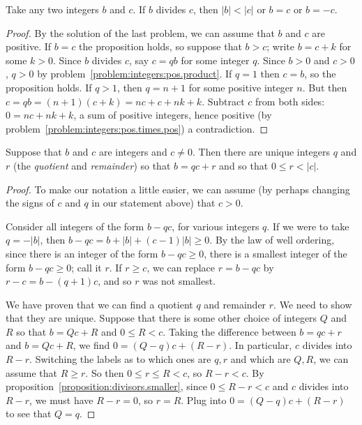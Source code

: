 \begin{proposition}\label{proposition:divisors.smaller}
Take any two integers \(b\) and \(c\).
If \(b\) divides \(c\), then \(|b| < |c|\) or \(b=c\) or \(b=-c\).
\end{proposition}
\begin{proof}
By the solution of the last problem, we can assume that \(b\) and \(c\) are positive.
If \(b=c\) the proposition holds, so suppose that \(b>c\); write \(b=c+k\) for some \(k>0\).
Since \(b\) divides \(c\), say \(c=qb\) for some integer \(q\).
Since \(b>0\) and \(c>0\), \(q>0\) by problem~\vref{problem:integers:pos.product}.
If \(q=1\) then \(c=b\), so the proposition holds.
If \(q>1\), then \(q=n+1\) for some positive integer \(n\).
But then \(c=qb=(n+1)(c+k)=nc+c+nk+k\).
Subtract \(c\) from both sides: \(0=nc+nk+k\), a sum of positive integers, hence positive (by problem~\vref{problem:integers:pos.times.pos}) a contradiction.
\end{proof}
\begin{theorem}
Suppose that \(b\) and \(c\) are integers and \(c \ne 0\).
Then there are unique integers \(q\) and \(r\) (the \emph{quotient} and \emph{remainder}) so that \(b=qc+r\) and so that \(0 \le r < |c|\).
\end{theorem}
\begin{proof}
To make our notation a little easier, we can assume (by perhaps changing the signs of \(c\) and \(q\) in our statement above) that \(c>0\).

Consider all integers of the form \(b-qc\), for various integers \(q\).
If we were to take \(q=-|b|\), then \(b-qc = b+|b| + (c-1)|b| \ge 0\).
By the law of well ordering, since there is an integer of the form \(b-qc \ge 0\), there is a smallest integer of the form \(b-qc \ge 0\); call it \(r\).
If \(r \ge c\), we can replace \(r=b-qc\) by \(r-c=b-(q+1)c\), and so \(r\) was not smallest.

We have proven that we can find a quotient \(q\) and remainder \(r\).
We need to show that they are unique.
Suppose that there is some other choice of integers \(Q\) and \(R\) so that \(b=Qc+R\) and \(0 \le R < c\).
Taking the difference between \(b=qc+r\) and \(b=Qc+R\), we find \(0=(Q-q)c+(R-r)\).
In particular, \(c\) divides into \(R-r\).
Switching the labels as to which ones are \(q,r\) and which are \(Q,R\), we can assume that \(R \ge r\).
So then \(0 \le r \le R < c\), so \(R-r < c\).
By proposition~\vref{proposition:divisors.smaller}, since \(0 \le R-r < c\) and \(c\) divides into \(R-r\), we must have \(R-r=0\), so \(r=R\).
Plug into \(0=(Q-q)c+(R-r)\) to see that \(Q=q\).
\end{proof}
